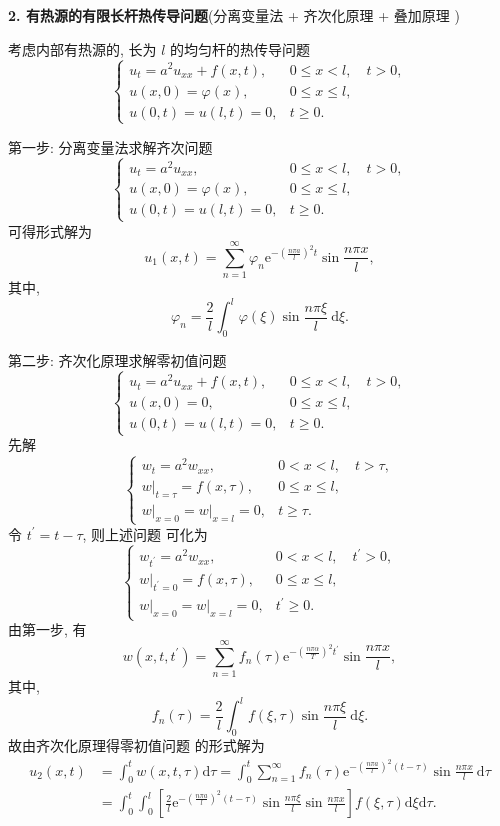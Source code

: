 \textbf{2. 有热源的有限长杆热传导问题}(分离变量法 + 齐次化原理 + 叠加原理 )

考虑内部有热源的, 长为 $ l $ 的均匀杆的热传导问题
$$
\left\{\begin{array}{ll}
u_{t}=a^{2} u_{x x}+f(x, t), & 0 \leqslant x<l, \quad t>0, \\
u(x, 0)=\varphi(x), & 0 \leqslant x \leqslant l, \\
u(0, t)=u(l, t)=0, & t \geqslant 0 .
\end{array}\right.
$$

第一步: 分离变量法求解齐次问题
$$
\left\{\begin{array}{ll}
u_{t}=a^{2} u_{x x}, & 0 \leqslant x<l, \quad t>0, \\
u(x, 0)=\varphi(x), & 0 \leqslant x \leqslant l, \\
u(0, t)=u(l, t)=0, & t \geqslant 0 .
\end{array}\right.
$$
可得形式解为
$$
u_{1}(x, t)=\sum_{n=1}^{\infty} \varphi_{n} \mathrm{e}^{-\left(\frac{n \pi a}{l}\right)^{2} t} \sin \frac{n \pi x}{l},
$$
其中,
$$
\varphi_{n}=\frac{2}{l} \int_{0}^{l} \varphi(\xi) \sin \frac{n \pi \xi}{l} \mathrm{~d} \xi .
$$

第二步: 齐次化原理求解零初值问题
$$
\left\{\begin{array}{ll}
u_{t}=a^{2} u_{x x}+f(x, t), & 0 \leqslant x<l, \quad t>0, \\
u(x, 0)=0, & 0 \leqslant x \leqslant l, \\
u(0, t)=u(l, t)=0, & t \geqslant 0 .
\end{array}\right.
$$
先解
$$
\left\{\begin{array}{ll}
w_{t}=a^{2} w_{x x}, & 0<x<l, \quad t>\tau, \\
\left.w\right|_{t=\tau}=f(x, \tau), & 0 \leqslant x \leqslant l, \\
\left.w\right|_{x=0}=\left.w\right|_{x=l}=0, & t \geqslant \tau .
\end{array}\right.
$$
令 $ t^{\prime}=t-\tau $, 则上述问题 可化为
$$
\left\{\begin{array}{ll}
w_{t^{\prime}}=a^{2} w_{x x}, & 0<x<l, \quad t^{\prime}>0, \\
\left.w\right|_{t^{\prime}=0}=f(x, \tau), & 0 \leqslant x \leqslant l, \\
\left.w\right|_{x=0}=\left.w\right|_{x=l}=0, & t^{\prime} \geqslant 0 .
\end{array}\right.
$$
由第一步, 有
$$
w\left(x, t, t^{\prime}\right)=\sum_{n=1}^{\infty} f_{n}(\tau) \mathrm{e}^{-\left(\frac{n \pi \alpha}{T}\right)^{2} t^{\prime}} \sin \frac{n \pi x}{l},
$$
其中,
$$
f_{n}(\tau)=\frac{2}{l} \int_{0}^{l} f(\xi, \tau) \sin \frac{n \pi \xi}{l} \mathrm{~d} \xi .
$$
故由齐次化原理得零初值问题 的形式解为
$$
\begin{aligned}
u_{2}(x, t) & =\int_{0}^{t} w(x, t, \tau) \mathrm{d} \tau=\int_{0}^{t} \sum_{n=1}^{\infty} f_{n}(\tau) \mathrm{e}^{-\left(\frac{n \pi a}{l}\right)^{2}(t-\tau)} \sin \frac{n \pi x}{l} \mathrm{~d} \tau \\
& =\int_{0}^{t} \int_{0}^{l}\left[\frac{2}{l} \mathrm{e}^{-\left(\frac{n \pi a}{l}\right)^{2}(t-\tau)} \sin \frac{n \pi \xi}{l} \sin \frac{n \pi x}{l}\right] f(\xi, \tau) \mathrm{d} \xi \mathrm{d} \tau .
\end{aligned}
$$

